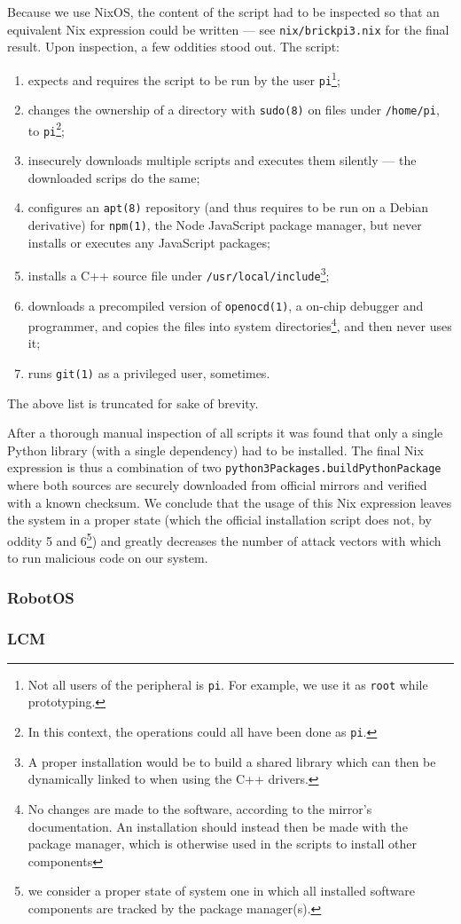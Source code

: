 Because we use NixOS, the content of the script had to be inspected so that an equivalent Nix expression could be written ---
see \texttt{nix/brickpi3.nix} for the final result.
Upon inspection, a few oddities stood out. The script:
\begin{enumerate}
\item expects and requires the script to be run by the user \texttt{pi}\footnote{Not all users of the peripheral is \texttt{pi}. For example, we use it as \texttt{root} while prototyping.};
\item changes the ownership of a directory with \texttt{sudo(8)} on files under \texttt{/home/pi}, to \texttt{pi}\footnote{In this context, the operations could all have been done as \texttt{pi}.};
\item insecurely downloads multiple scripts and executes them silently --- the downloaded scrips do the same;
\item configures an \texttt{apt(8)} repository (and thus requires to be run on a Debian derivative) for \texttt{npm(1)},
  the Node JavaScript package manager, but never installs or executes any JavaScript packages;
\item installs a C++ source file under \texttt{/usr/local/include}\footnote{A proper installation would be to build a shared library which can then be dynamically linked to when using the C++ drivers.};
\item downloads a precompiled version of \texttt{openocd(1)}, a on-chip debugger and programmer,
  and copies the files into system directories\footnote{No changes are made to the software, according to the mirror's documentation. An installation should instead then be made with the package manager, which is otherwise used in the scripts to install other components}, and then never uses it;
\item runs \texttt{git(1)} as a privileged user, sometimes.
\end{enumerate}
The above list is truncated for sake of brevity.

After a thorough manual inspection of all scripts it was found that only a single Python library (with a single dependency) had to be installed.
The final Nix expression is thus a combination of two \texttt{python3Packages.buildPythonPackage} where both sources are securely downloaded from official mirrors and verified with a known checksum.
We conclude that the usage of this Nix expression leaves the system in a proper state (which the official installation script does not, by oddity 5 and 6\footnote{we consider a proper state of system one in which all installed software components are tracked by the package manager(s).}) and greatly decreases the number of attack vectors with which to run malicious code on our system.


\subsubsection{RobotOS}

\subsubsection{LCM}
